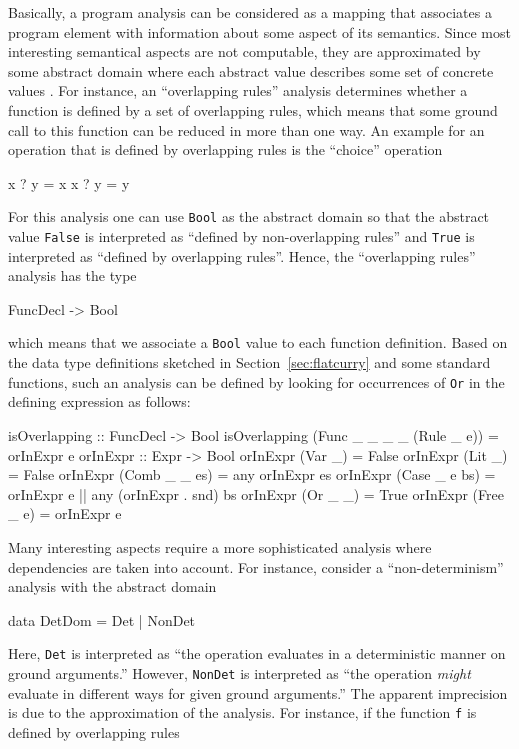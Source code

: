 \documentclass{llncs}
\newcommand{\code}[1]{\mbox{\small\texttt{#1}}}
\begin{document}
Basically, a program analysis can be considered as a mapping
that associates a program element with information about some 
aspect of its semantics.
Since most interesting semantical aspects are not computable,
they are approximated by some abstract domain
where each abstract value describes some set of concrete values
\cite{CousotCousot77}.
For instance, an ``overlapping rules'' analysis determines
whether a function is defined by
a set of overlapping rules, which means that
some ground call to this function can be reduced in
more than one way.
An example for an operation that is defined by overlapping
rules is the ``choice'' operation
\begin{curry}
x ? y = x
x ? y = y
\end{curry}
For this analysis one can use \code{Bool} as the abstract domain
so that the abstract value \code{False} is interpreted
as ``defined by non-overlapping rules'' and \code{True}
is interpreted as ``defined by overlapping rules''.
Hence, the ``overlapping rules'' analysis has the type
\begin{curry}
FuncDecl -> Bool
\end{curry}
which means that we associate a \code{Bool} value to each function definition.
Based on the data type definitions sketched in
Section~\ref{sec:flatcurry} and some standard functions,
such an analysis can be defined by looking for occurrences of \code{Or}
in the defining expression as follows:
\begin{curry}
isOverlapping :: FuncDecl -> Bool
isOverlapping (Func _ _ _ _ (Rule _ e))   = orInExpr e
orInExpr :: Expr -> Bool
orInExpr (Var _)       = False
orInExpr (Lit _)       = False
orInExpr (Comb _ _ es) = any orInExpr es
orInExpr (Case _ e bs) = orInExpr e || any (orInExpr . snd) bs
orInExpr (Or _ _)      = True
orInExpr (Free _ e)    = orInExpr e
\end{curry}
Many interesting aspects require a more sophisticated analysis
where dependencies are taken into account.
For instance, consider a ``non-determinism'' analysis
with the abstract domain
\begin{curry}
data DetDom = Det | NonDet
\end{curry}
Here, \code{Det} is interpreted as ``the operation evaluates
in a deterministic manner on ground arguments.''
However, \code{NonDet} is interpreted as ``the operation \emph{might}
evaluate in different ways for given ground arguments.''
The apparent imprecision is due to the approximation of the analysis.
For instance, if the function \code{f} is defined by overlapping rules
\end{document}
